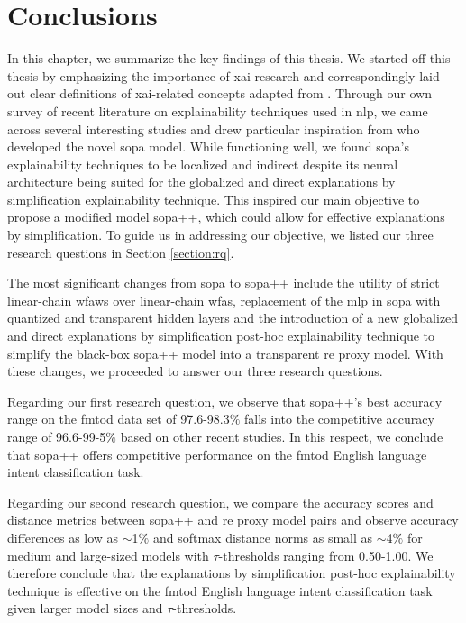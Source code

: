 \chapter{Conclusions}

\label{chapter:conclusions}

In this chapter, we summarize the key findings of this thesis. We
started off this thesis by emphasizing the importance of \ac{xai} research and
correspondingly laid out clear definitions of \ac{xai}-related concepts adapted
from \citet{arrieta2020explainable}. Through our own survey of recent literature
on explainability techniques used in \ac{nlp}, we came across several
interesting studies and drew particular inspiration from
\citet{schwartz2018sopa} who developed the novel \ac{sopa} model. While functioning
well, we found \ac{sopa}'s explainability techniques to be localized and indirect
despite its neural architecture being suited for the globalized and direct
explanations by simplification explainability technique. This inspired our main
objective to propose a modified model \ac{sopa}++, which could allow for
effective explanations by simplification. To guide us in addressing our
objective, we listed our three research questions in Section \ref{section:rq}.

The most significant changes from \ac{sopa} to \ac{sopa}++ include the utility of strict
linear-chain \ac{wfaws} over linear-chain \ac{wfas}, replacement of the \ac{mlp}
in \ac{sopa} with quantized and transparent hidden layers and the introduction of a
new globalized and direct explanations by simplification post-hoc explainability
technique to simplify the black-box \ac{sopa}++ model into a transparent \ac{re}
proxy model. With these changes, we proceeded to answer our three research
questions.

Regarding our first research question, we observe that \ac{sopa}++'s best accuracy
range on the \ac{fmtod} data set of 97.6-98.3$\%$ falls into the competitive accuracy
range of 96.6-99-5$\%$ based on other recent studies. In this respect, we
conclude that \ac{sopa}++ offers competitive performance on the \ac{fmtod} English
language intent classification task.

Regarding our second research question, we compare the accuracy scores and
distance metrics between \ac{sopa}++ and \ac{re} proxy model pairs and observe accuracy
differences as low as $\sim$1$\%$ and softmax distance norms as small as $\sim$4$\%$ for
medium and large-sized models with $\tau$-thresholds ranging from 0.50-1.00. We
therefore conclude that the explanations by simplification post-hoc
explainability technique is effective on the \ac{fmtod} English language intent
classification task given larger model sizes and $\tau$-thresholds.

